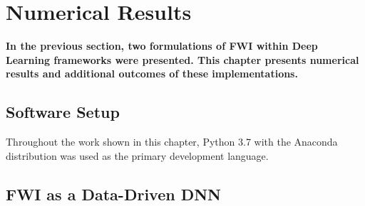 \chapter{Numerical Results}
\textbf{In the previous section, two formulations of FWI within Deep Learning frameworks were presented. This chapter presents numerical results and additional outcomes of these implementations.}  

\section{Software Setup}\label{sec:results_results_software_setup}
Throughout the work shown in this chapter, Python 3.7 with the Anaconda distribution was used as the primary development language.


\section[FWI as a Data-Driven DNN]{FWI as a Data-Driven DNN}\label{sec:results_FWI_as_a_Learned_Direct_Approximation}

